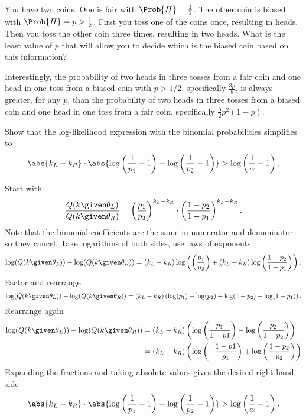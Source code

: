 \documentclass[12pt]{article}
\begin{document}
\begin{exercise}
    You have two coins.  One is fair with \( \Prob{H} = \frac{1}{2} \).
    The other coin is biased with \( \Prob{H} = p > \frac{1}{2} \).
    First you toss one of the coins once, resulting in heads.  Then you
    toss the other coin three times, resulting in two heads. What is the
    least value of \( p \) that will allow you to decide which is the
    biased coin based on this information?
\end{exercise}
\begin{solution}
    Interestingly, the probability of two heads in three tosses from a
    fair coin and one head in one toss from a biased coin with \( p >
    1/2 \), specifically \( \frac{3p}{8} \), is always greater, for any \(
    p \), than the probability of two heads in three tosses from a
    biased coin and one head in one toss from a fair coin, specifically \(
    \frac{3}{2}p^2(1-p) \).
\end{solution}
\begin{exercise}
    Show that the log-likelihood expression with the binomial
    probabilities simplifies to
    \[
        \abs{k_L - k_R} \cdot \abs{ \log\left( \frac{1}{p_1} - 1 \right)
        - \log\left( \frac{1}{p_2} - 1 \right) } > \log \left( \frac{1}{\alpha}
        - 1 \right).
    \]
\end{exercise}
\begin{solution}
    Start with
    \[
        \frac{Q(k \given \theta_L)}{Q(k \given \theta_R)} = \left(\frac{p_1}
        {p_2} \right)^{k_L - k_R} \cdot \left(\frac{1-p_2}{1-p_1} \right)^
        {k_L - k_R}.
    \] Note that the binomial coefficients are the same in numerator and
    denominator so they cancel. Take logarithms of both sides, use laws
    of exponents
    \[
        \log(Q(k \given \theta_L)) - \log(Q(k \given \theta_R)) = (k_L -
        k_R) \log \left( \left(\frac{p_1}{p_2} \right) + (k_L - k_R)
        \log \left(\frac{1-p_2}{1-p_1} \right) \right).
    \] Factor and rearrange
    \[
        \log(Q(k \given \theta_L)) - \log(Q(k \given \theta_R)) = (k_L -
        k_R) \left( \log(p_1) - \log(p_2) + \log(1-p_2) - \log(1-p_1)
        \right).
    \] Rearrange again
    \begin{align*}
        \log(Q(k \given \theta_L)) - \log(Q(k \given \theta_R)) &= (k_L
        - k_R) \left( \log \left( \frac{p_1}{1-p1} \right) - \log \left(\frac
        {p_{2}}{1-p_2}\right) \right) \\
        & = (k_L - k_R) \left( \log \left( -\frac{1-p1}{p_1} \right) +
        \log \left(\frac{1-p_2}{p_{2}}\right) \right) \\
    \end{align*}
    Expanding the fractions and taking absolute values gives the desired
    right hand side
    \[
        \abs{k_L - k_R} \cdot \abs{ \log\left( \frac{1}{p_1} - 1 \right)
        - \log\left( \frac{1}{p_2} - 1 \right) } > \log \left( \frac{1}{\alpha}
        - 1 \right).
    \]
\end{solution}
\end{document}
